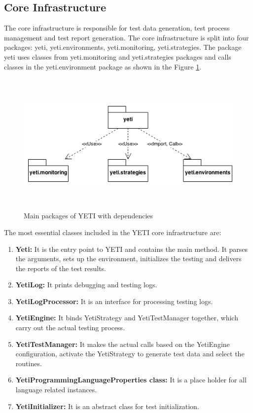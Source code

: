 \subsection{Core Infrastructure}
The core infrastructure is responsible for test data generation, test process management and test report generation. The core infrastructure is split into four packages: yeti, yeti.environments, yeti.monitoring, yeti.strategies. The package yeti uses classes from yeti.monitoring and yeti.strategies packages and calls classes in the yeti.environment package as shown in the Figure \ref{fig:yetiCore}. 

\begin{figure}[h]
	\centering
	\includegraphics[width=15cm, height=7cm]{chapter3/yetiCore.png}
	\caption{Main packages of YETI with dependencies }
	\label{fig:yetiCore}
\end{figure}

The most essential classes included in the YETI core infrastructure are:
\begin{enumerate}
\item {\textbf{Yeti:}} It is the entry point to YETI and contains the main method. It parses the arguments, sets up the environment, initializes the testing and delivers the reports of the test results.
\item {\textbf{YetiLog:}} It prints debugging and testing logs. 
\item {\textbf{YetiLogProcessor:}} It is an interface for processing testing logs.
\item {\textbf{YetiEngine:}} It binds YetiStrategy and YetiTestManager together, which carry out the actual testing process.
\item {\textbf{YetiTestManager:}} It makes the actual calls based on the YetiEngine configuration, activate the YetiStrategy to generate test data and select the routines.
\item {\textbf{YetiProgrammingLanguageProperties class:}} It is a place holder for all language related instances.
\item {\textbf{YetiInitializer:}} It is an abstract class for test initialization.
\end{enumerate}

